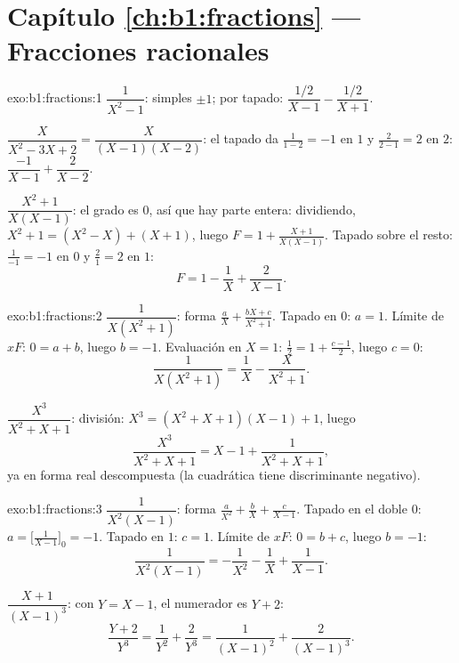 \section*{Capítulo \ref{ch:b1:fractions} --- Fracciones racionales}

\begin{solution}{exo:b1:fractions:1}
$\dfrac{1}{X^2 - 1}$:  simples $\pm 1$; por tapado:
$\dfrac{1/2}{X-1} - \dfrac{1/2}{X+1}$.

$\dfrac{X}{X^2 - 3X + 2} = \dfrac{X}{(X-1)(X-2)}$: el tapado da
$\frac{1}{1-2} = -1$ en $1$ y $\frac{2}{2-1} = 2$ en $2$:
$\dfrac{-1}{X-1} + \dfrac{2}{X-2}$.

$\dfrac{X^2+1}{X(X-1)}$: el grado es $0$, así que hay parte entera:
dividiendo, $X^2 + 1 = (X^2 - X) + (X + 1)$, luego
$F = 1 + \frac{X+1}{X(X-1)}$. Tapado sobre el resto: $\frac{1}{-1} = -1$
en $0$ y $\frac{2}{1} = 2$ en $1$:
\[
F = 1 - \frac{1}{X} + \frac{2}{X-1} .
\]
\end{solution}

\begin{solution}{exo:b1:fractions:2}
$\dfrac{1}{X(X^2+1)}$: forma $\frac aX + \frac{bX + c}{X^2 + 1}$.
Tapado en $0$: $a = 1$. Límite de $xF$: $0 = a + b$, luego $b = -1$.
Evaluación en $X = 1$: $\frac12 = 1 + \frac{c - 1}{2}$, luego $c = 0$:
\[
\frac{1}{X(X^2+1)} = \frac 1X - \frac{X}{X^2+1} .
\]

$\dfrac{X^3}{X^2+X+1}$: división: $X^3 = (X^2+X+1)(X - 1) + 1$, luego
\[
\frac{X^3}{X^2+X+1} = X - 1 + \frac{1}{X^2 + X + 1} ,
\]
ya en forma real descompuesta (la cuadrática tiene discriminante
negativo).
\end{solution}

\begin{solution}{exo:b1:fractions:3}
$\dfrac{1}{X^2(X-1)}$: forma $\frac{a}{X^2} + \frac bX +
\frac{c}{X-1}$. Tapado en el  doble $0$:
$a = \bigl[\frac{1}{X-1}\bigr]_{0} = -1$. Tapado en $1$: $c = 1$.
Límite de $xF$: $0 = b + c$, luego $b = -1$:
\[
\frac{1}{X^2(X-1)} = -\frac{1}{X^2} - \frac1X + \frac{1}{X-1} .
\]

$\dfrac{X+1}{(X-1)^3}$: con $Y = X - 1$, el numerador es $Y + 2$:
\[
\frac{Y + 2}{Y^3} = \frac{1}{Y^2} + \frac{2}{Y^3}
= \frac{1}{(X-1)^2} + \frac{2}{(X-1)^3} .
\]
\end{solution}

